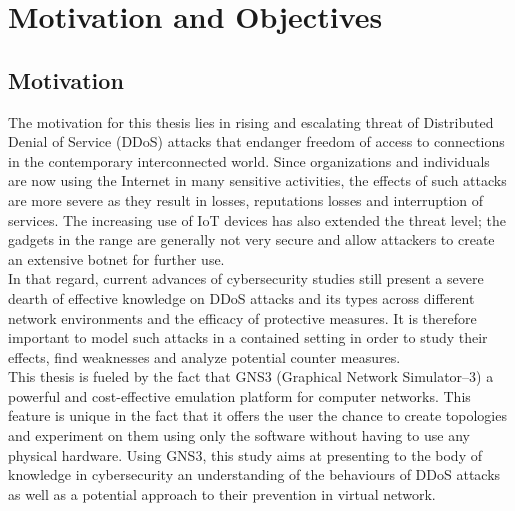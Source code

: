 \section{Motivation and Objectives}
\subsection{Motivation}
The motivation for this thesis lies in rising and escalating threat of Distributed Denial of Service (DDoS) attacks that endanger freedom of access to connections in the contemporary interconnected world. Since organizations and individuals are now using the Internet in many sensitive activities, the effects of such attacks are more severe as they result in losses, reputations losses and interruption of services. The increasing use of IoT devices has also extended the threat level; the gadgets in the range are generally not very secure and allow attackers to create an extensive botnet for further use.
\\
In that regard, current advances of cybersecurity studies still present a severe dearth of effective knowledge on DDoS attacks and its types across different network environments and the efficacy of protective measures. It is therefore important to model such attacks in a contained setting in order to study their effects, find weaknesses and analyze potential counter measures.
\\
This thesis is fueled by the fact that GNS3 (Graphical Network Simulator–3) a powerful and cost-effective emulation platform for computer networks. This feature is unique in the fact that it offers the user the chance to create topologies and experiment on them using only the software without having to use any physical hardware. Using GNS3, this study aims at presenting to the body of knowledge in cybersecurity an understanding of the behaviours of DDoS attacks as well as a potential approach to their prevention in virtual network.
